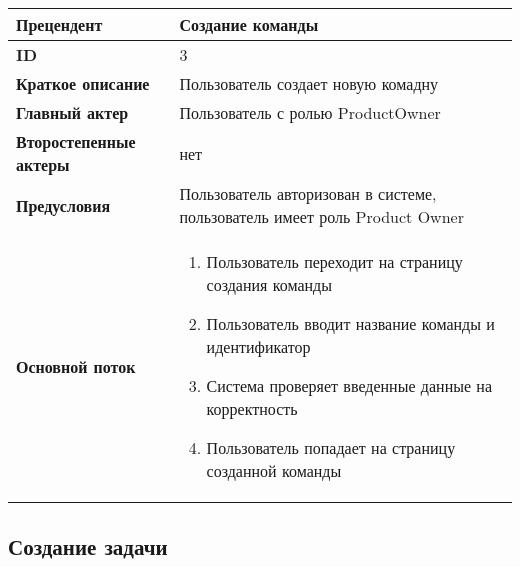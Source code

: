 \documentclass[14pt,a4paper]{extarticle}
\begin{document}
\begin{tabular}{|l|p{9cm}|}
	\hline
	\textbf{Прецендент}            & Создание команды                                                          \\
	\hline
	\textbf{ID}                    & 3                                                                         \\
	\hline
	\textbf{Краткое описание}      & Пользователь создает новую комадну                                        \\
	\hline
	\textbf{Главный актер}         & Пользователь с ролью ProductOwner                                         \\
	\hline
	\textbf{Второстепенные актеры} & нет                                                                       \\
	\hline
	\textbf{Предусловия}           & Пользователь авторизован в системе, пользователь имеет роль Product Owner \\
	\hline
	\textbf{Основной поток}        & \begin{enumerate}
		                                 \item Пользователь переходит на страницу создания команды
		                                 \item Пользователь вводит название команды и идентификатор
		                                 \item Система проверяет введенные данные на корректность
		                                 \item Пользователь попадает на страницу созданной команды
	                                 \end{enumerate}                 \\
	\hline
\end{tabular}

\subsection{Создание задачи}
\end{document}
